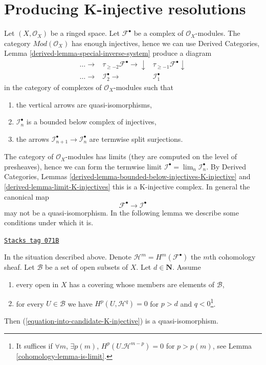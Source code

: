 \section{Producing K-injective resolutions}
\label{cohomology-section-K-injective}
Let $(X, \mathcal{O}_X)$ be a ringed space.
Let $\mathcal{F}^\bullet$ be a complex of $\mathcal{O}_X$-modules.
The category $\textit{Mod}(\mathcal{O}_X)$ has enough injectives, hence
we can use
Derived Categories, Lemma \ref{derived-lemma-special-inverse-system}
produce a diagram
$$
\begin{array}{ccc}\ldots \longrightarrow & \tau_{\geq -2}\mathcal{F}^\bullet \longrightarrow\downarrow & \tau_{\geq -1}\mathcal{F}^\bullet \downarrow \\ \ldots \longrightarrow & \mathcal{I}_2^\bullet \longrightarrow & \mathcal{I}_1^\bullet\end{array}
$$
in the category of complexes of $\mathcal{O}_X$-modules such that
\begin{enumerate}
\item the vertical arrows are quasi-isomorphisms,
\item $\mathcal{I}_n^\bullet$ is a bounded below complex of injectives,
\item the arrows $\mathcal{I}_{n + 1}^\bullet \to \mathcal{I}_n^\bullet$
are termwise split surjections.
\end{enumerate}
The category of $\mathcal{O}_X$-modules has limits (they are computed
on the level of presheaves), hence we can form the termwise limit
$\mathcal{I}^\bullet = \lim_n \mathcal{I}_n^\bullet$. By
Derived Categories, Lemmas
\ref{derived-lemma-bounded-below-injectives-K-injective} and
\ref{derived-lemma-limit-K-injectives}
this is a K-injective complex. In general the canonical map
\begin{equation}
\label{equation-into-candidate-K-injective}
\mathcal{F}^\bullet \to \mathcal{I}^\bullet
\end{equation}
may not be a quasi-isomorphism. In the following lemma we describe some
conditions under which it is.

\begin{lemma}[K injective]
\label{cohomology-lemma-K-injective}
\href{https://stacks.math.columbia.edu/tag/071B}{\texttt{Stacks tag 071B}}

In the situation described above.
Denote $\mathcal{H}^m = H^m(\mathcal{F}^\bullet)$ the $m$th cohomology sheaf.
Let $\mathcal{B}$ be a set of open subsets of $X$.
Let $d \in \mathbf{N}$.
Assume
\begin{enumerate}
\item every open in $X$ has a covering whose members are
elements of $\mathcal{B}$,
\item for every $U \in \mathcal{B}$ we have $H^p(U, \mathcal{H}^q) = 0$
for $p > d$ and $q < 0$\footnote{It suffices if
$\forall m$, $\exists p(m)$, $H^p(U. \mathcal{H}^{m - p}) = 0$ for
$p > p(m)$, see Lemma \ref{cohomology-lemma-is-limit}.}.
\end{enumerate}
Then (\ref{equation-into-candidate-K-injective}) is a quasi-isomorphism.
\end{lemma}

